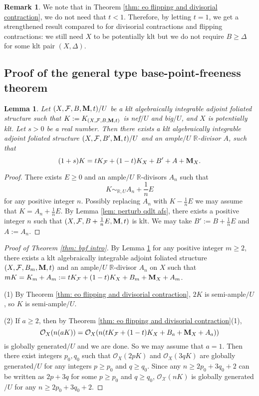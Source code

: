 \documentclass[12pt]{amsart}
\numberwithin{equation}{section}
\newcommand{\Mm}{{\bf{M}}}
\newcommand{\Rr}{\mathbb{R}}
\newcommand{\Ff}{\mathcal{F}}
\newtheorem{lem}[thm]{Lemma}
\theoremstyle{definition}
\theoremstyle{definition}
\newtheorem{rem}[thm]{Remark}
\theoremstyle{definition}
\begin{document}
\begin{rem}
    We note that in Theorem \ref{thm: eo flipping and divisorial contraction}, we do not need that $t<1$. Therefore, by letting $t=1$, we get a strengthened result compared to \cite[Theorem 1.2(1)]{LMX24b} for divisorial contractions and flipping contractions: we still need $X$ to be potentially klt but we do not require $B\geq\Delta$ for some klt pair $(X,\Delta)$. 
\end{rem}

\subsection{Proof of the general type base-point-freeness theorem}

\begin{lem}\label{lem: afs big and nef equivalent to +a}
Let $(X,\Ff,B,\Mm,t)/U$ be a klt algebraically integrable adjoint foliated structure such that $K:=K_{(X,\Ff,B,\Mm,t)}$ is nef$/U$ and big$/U$, and $X$ is potentially klt. Let $s>0$ be a real number. Then there exists a klt algebraically integrable adjoint foliated structure $(X,\Ff,B',\Mm,t)/U$ and an ample$/U$ $\Rr$-divisor $A$, such that
$$(1+s)K=tK_{\Ff}+(1-t)K_X+B'+A+\Mm_X.$$
\end{lem}
\begin{proof}
There exists $E\geq 0$ and an ample$/U$ $\Rr$-divisors $A_n$ such that 
$$K\sim_{\mathbb R,U}A_n+\frac{1}{n}E$$
for any positive integer $n$. Possibly replacing $A_n$ with $K-\frac{1}{n}E$ we may assume that $K=A_n+\frac{1}{n}E$. By Lemma \ref{lem: perturb qdlt afs}, there exists a positive integer $n$ such that $(X,\Ff,B+\frac{1}{n}E,\Mm,t)$ is klt. We may take $B':=B+\frac{1}{n}E$ and $A:=A_n$.
\end{proof}

\begin{proof}[Proof of Theorem \ref{thm: bpf intro}]
By Lemma \ref{lem: afs big and nef equivalent to +a} for any positive integer $m\geq 2$, there exists a klt algebraically integrable adjoint foliated structure $(X,\Ff,B_m,\Mm,t)$ and an ample$/U$ $\Rr$-divisor $A_n$ on $X$ such that 
$mK=K_m+A_m:=tK_{\Ff}+(1-t)K_X+B_m+\Mm_X+A_m$.

(1) By Theorem \ref{thm: eo flipping and divisorial contraction}, $2K$ is semi-ample$/U$, so $K$ is semi-ample$/U$.

(2) If $a\geq 2$, then by Theorem \ref{thm: eo flipping and divisorial contraction}(1), $$\mathcal{O}_X(n(aK))=\mathcal{O}_X(n(tK_{\Ff}+(1-t)K_X+B_a+\Mm_X+A_a))$$
is globally generated$/U$ and we are done. So we may assume that $a=1$. Then there exist integers $p_0,q_0$ such that $\mathcal{O}_X(2pK)$ and $\mathcal{O}_X(3qK)$ are globally generated$/U$ for any integers $p\geq p_0$ and $q\geq q_0$. Since any $n\geq 2p_0+3q_0+2$ can be written as $2p+3q$ for some $p\geq p_0$ and $q\geq q_0$, $\mathcal{O_X}(nK)$ is globally generated$/U$ for any $n\geq 2p_0+3q_0+2$.
\end{proof}
\end{document}
